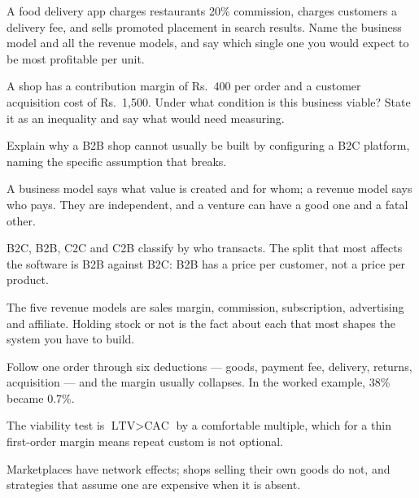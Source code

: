 \begin{checkpoint}
\begin{tightnum}
  \item A food delivery app charges restaurants 20\% commission, charges
        customers a delivery fee, and sells promoted placement in search
        results. Name the business model and all the revenue models, and say
        which single one you would expect to be most profitable per unit.
  \item A shop has a contribution margin of Rs.~400 per order and a customer
        acquisition cost of Rs.~1{,}500. Under what condition is this business
        viable? State it as an inequality and say what would need measuring.
  \item Explain why a B2B shop cannot usually be built by configuring a B2C
        platform, naming the specific assumption that breaks.
\end{tightnum}
\end{checkpoint}

\begin{chaptersummary}
\begin{tight}
  \item A business model says what value is created and for whom; a revenue
        model says who pays. They are independent, and a venture can have a
        good one and a fatal other.
  \item B2C, B2B, C2C and C2B classify by who transacts. The split that most
        affects the software is B2B against B2C: B2B has a price per customer,
        not a price per product.
  \item The five revenue models are sales margin, commission, subscription,
        advertising and affiliate. Holding stock or not is the fact about each
        that most shapes the system you have to build.
  \item Follow one order through six deductions --- goods, payment fee,
        delivery, returns, acquisition --- and the margin usually collapses. In
        the worked example, 38\% became 0.7\%.
  \item The viability test is $\text{LTV} > \text{CAC}$ by a comfortable
        multiple, which for a thin first-order margin means repeat custom is
        not optional.
  \item Marketplaces have network effects; shops selling their own goods do
        not, and strategies that assume one are expensive when it is absent.
\end{tight}
\end{chaptersummary}

